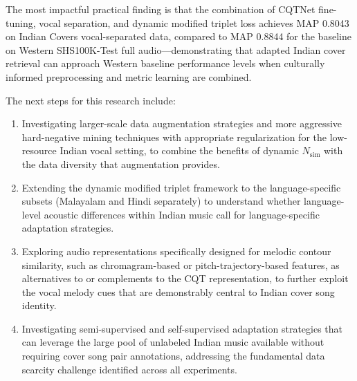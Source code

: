 \documentclass[conference]{IEEEtran}
\begin{document}
The most impactful practical finding is that the combination of CQTNet fine-tuning, vocal separation, and dynamic modified triplet loss achieves MAP 0.8043 on Indian Covers vocal-separated data, compared to MAP 0.8844 for the baseline on Western SHS100K-Test full audio—demonstrating that adapted Indian cover retrieval can approach Western baseline performance levels when culturally informed preprocessing and metric learning are combined.

The next steps for this research include:
\begin{enumerate}
    \item Investigating larger-scale data augmentation strategies and more aggressive hard-negative mining techniques with appropriate regularization for the low-resource Indian vocal setting, to combine the benefits of dynamic $N_{\text{sim}}$ with the data diversity that augmentation provides.
    \item Extending the dynamic modified triplet framework to the language-specific subsets (Malayalam and Hindi separately) to understand whether language-level acoustic differences within Indian music call for language-specific adaptation strategies.
    \item Exploring audio representations specifically designed for melodic contour similarity, such as chromagram-based or pitch-trajectory-based features, as alternatives to or complements to the CQT representation, to further exploit the vocal melody cues that are demonstrably central to Indian cover song identity.
    \item Investigating semi-supervised and self-supervised adaptation strategies that can leverage the large pool of unlabeled Indian music available without requiring cover song pair annotations, addressing the fundamental data scarcity challenge identified across all experiments.
\end{enumerate}
\end{document}
